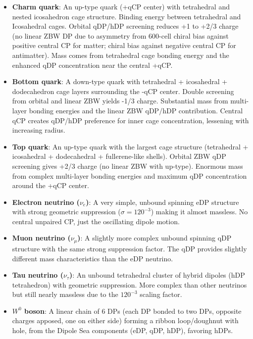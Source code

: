 \documentclass{article}
\begin{document}
\begin{itemize}
\item \textbf{Charm quark}: An up-type quark (+qCP center) with tetrahedral and nested icosahedron cage structure. Binding energy between tetrahedral and Icosahedral cages. Orbital qDP/hDP screening reduces +1 to +2/3 charge (no linear ZBW DP due to asymmetry from 600-cell chiral bias against positive central CP for matter; chiral bias against negative central CP for antimatter). Mass comes from tetrahedral cage bonding energy and the enhanced qDP concentration near the central +qCP.

\item \textbf{Bottom quark}: A down-type quark with tetrahedral + icosahedral + dodecahedron cage layers surrounding the -qCP center. Double screening from orbital and linear ZBW yields -1/3 charge. Substantial mass from multi-layer bonding energies and the linear ZBW qDP/hDP contribution. Central qCP creates qDP/hDP preference for inner cage concentration, lessening with increasing radius.

\item \textbf{Top quark}: An up-type quark with the largest cage structure (tetrahedral + icosahedral + dodecahedral + fullerene-like shells). Orbital ZBW qDP screening gives +2/3 charge (no linear ZBW with up-type). Enormous mass from complex multi-layer bonding energies and maximum qDP concentration around the +qCP center.

\item \textbf{Electron neutrino ($\nu_e$)}: A very simple, unbound spinning eDP structure with strong geometric suppression ($\sigma = 120^{-3}$) making it almost massless. No central unpaired CP, just the oscillating dipole motion.

\item \textbf{Muon neutrino ($\nu_\mu$)}: A slightly more complex unbound spinning qDP structure with the same strong suppression factor. The qDP provides slightly different mass characteristics than the eDP neutrino.

\item \textbf{Tau neutrino ($\nu_\tau$)}: An unbound tetrahedral cluster of hybrid dipoles (hDP tetrahedron) with geometric suppression. More complex than other neutrinos but still nearly massless due to the $120^{-3}$ scaling factor.

\item \textbf{$W^0$ boson}: A linear chain of 6 DPs (each DP bonded to two DPs, opposite charges apposed, one on either side) forming a ribbon loop/doughnut with hole, from the Dipole Sea components (eDP, qDP, hDP), favoring hDPs. 


\end{itemize}
\end{document}
